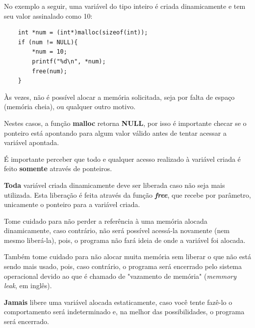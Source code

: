 \documentclass[12pt]{article}
\newcommand\tab[1][1cm]{\hspace*{#1}}
\begin{document}
\par\tab No exemplo a seguir, uma variável do tipo inteiro é criada dinamicamente e tem seu valor assinalado como 10:

\hspace{0.25cm}
\begin{lstlisting}
    int *num = (int*)malloc(sizeof(int));
    if (num != NULL){
        *num = 10;
        printf("%d\n", *num);
        free(num);
    }
\end{lstlisting}

\hspace{0.25cm}
\begin{tcolorbox}[colback=yellow!5!white,colframe=yellow!75!black,title=Atenção!]
  \par\tab Às vezes, não é possível alocar a memória solicitada, seja por falta de espaço (memória cheia), ou qualquer outro motivo.
  \par\tab Nestes casos, a função \textbf{malloc} retorna \textbf{NULL}, por isso é importante checar se o ponteiro está apontando para algum valor válido antes de tentar acessar a variável apontada.
\end{tcolorbox}

\par\tab É importante perceber que todo e qualquer acesso realizado à variável criada é feito \textbf{somente} através de ponteiros.

\hspace{0.25cm}
\begin{tcolorbox}[colback=red!5!white,colframe=red!75!black,title=Cuidado!]
  \par\tab \textbf{Toda} variável criada dinamicamente deve ser liberada caso não seja mais utilizada. Esta liberação é feita através da função \textbf{\textit{free}}, que recebe por parâmetro, unicamente o ponteiro para a variável criada.
  \par\tab Tome cuidado para não perder a referência à uma memória alocada dinamicamente, caso contrário, não será possível acessá-la novamente (nem mesmo liberá-la), pois, o programa não fará ideia de onde a variável foi alocada.
  \par\tab Também tome cuidado para não alocar muita memória sem liberar o que não está sendo mais usado, pois, caso contrário, o programa será encerrado pelo sistema operacional devido ao que é chamado de "vazamento de memória" (\textit{memmory leak}, em inglês).
  \par\tab \textbf{Jamais} libere uma variável alocada estaticamente, caso você tente fazê-lo o comportamento será indeterminado e, na melhor das possibilidades, o programa será encerrado.
\end{tcolorbox}
\end{document}
